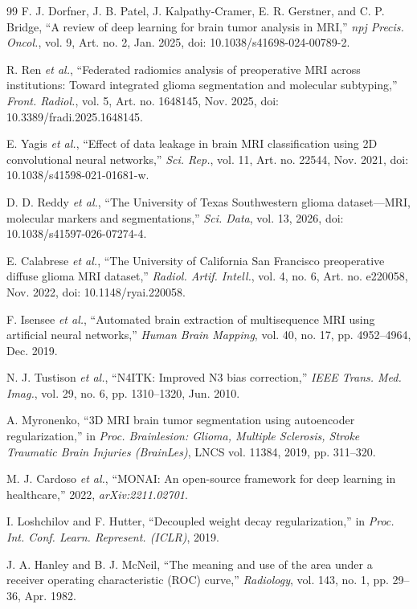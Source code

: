 \documentclass[conference]{IEEEtran}
\begin{document}
\begin{thebibliography}{99}
 F. J. Dorfner, J. B. Patel, J. Kalpathy-Cramer, E. R. Gerstner, and C. P. Bridge, ``A review of deep learning for brain tumor analysis in MRI,'' \emph{npj Precis. Oncol.}, vol. 9, Art. no. 2, Jan. 2025, doi: 10.1038/s41698-024-00789-2.

 R. Ren \emph{et al.}, ``Federated radiomics analysis of preoperative MRI across institutions: Toward integrated glioma segmentation and molecular subtyping,'' \emph{Front. Radiol.}, vol. 5, Art. no. 1648145, Nov. 2025, doi: 10.3389/fradi.2025.1648145.

 E. Yagis \emph{et al.}, ``Effect of data leakage in brain MRI classification using 2D convolutional neural networks,'' \emph{Sci. Rep.}, vol. 11, Art. no. 22544, Nov. 2021, doi: 10.1038/s41598-021-01681-w.

 D. D. Reddy \emph{et al.}, ``The University of Texas Southwestern glioma dataset---MRI, molecular markers and segmentations,'' \emph{Sci. Data}, vol. 13, 2026, doi: 10.1038/s41597-026-07274-4.

 E. Calabrese \emph{et al.}, ``The University of California San Francisco preoperative diffuse glioma MRI dataset,'' \emph{Radiol. Artif. Intell.}, vol. 4, no. 6, Art. no. e220058, Nov. 2022, doi: 10.1148/ryai.220058.

 F. Isensee \emph{et al.}, ``Automated brain extraction of multisequence MRI using artificial neural networks,'' \emph{Human Brain Mapping}, vol. 40, no. 17, pp. 4952--4964, Dec. 2019.

 N. J. Tustison \emph{et al.}, ``N4ITK: Improved N3 bias correction,'' \emph{IEEE Trans. Med. Imag.}, vol. 29, no. 6, pp. 1310--1320, Jun. 2010.

 A. Myronenko, ``3D MRI brain tumor segmentation using autoencoder regularization,'' in \emph{Proc. Brainlesion: Glioma, Multiple Sclerosis, Stroke Traumatic Brain Injuries (BrainLes)}, LNCS vol. 11384, 2019, pp. 311--320.

 M. J. Cardoso \emph{et al.}, ``MONAI: An open-source framework for deep learning in healthcare,'' 2022, \emph{arXiv:2211.02701}.

 I. Loshchilov and F. Hutter, ``Decoupled weight decay regularization,'' in \emph{Proc. Int. Conf. Learn. Represent. (ICLR)}, 2019.

 J. A. Hanley and B. J. McNeil, ``The meaning and use of the area under a receiver operating characteristic (ROC) curve,'' \emph{Radiology}, vol. 143, no. 1, pp. 29--36, Apr. 1982.


\end{thebibliography}
\end{document}
